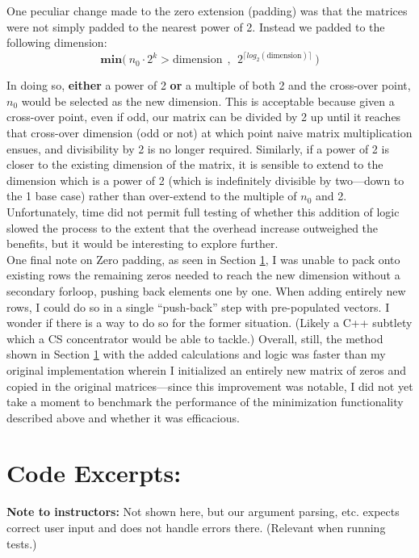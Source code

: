 \documentclass[conference]{styles/acmsiggraph}
\newcommand{\?}{\stackrel{?}{=}}
\begin{document}
One peculiar change made to the zero extension (padding) was that the matrices were not simply padded to the nearest power of 2.  Instead we padded to the following dimension: 
$$\mathbf{min(}\ n_0 \cdot 2^k > \text{dimension}\ \ \mathbf{,}\ \  2^{ \lceil log_2(\text{dimension}) \rceil }\ \mathbf{)}$$

In doing so, \textbf{either} a power of 2 \textbf{or} a multiple of both 2 and the cross-over point, $n_0$ would be selected as the new dimension.  This is acceptable because given a cross-over point, even if odd, our matrix can be divided by 2 up until it reaches that cross-over dimension (odd or not) at which point naive matrix multiplication ensues, and divisibility by 2 is no longer required.  Similarly, if a power of 2 is closer to the existing dimension of the matrix, it is sensible to extend to the dimension which is a power of 2 (which is indefinitely divisible by two---down to the 1 base case) rather than over-extend to the multiple of $n_0$ and 2. \\

Unfortunately, time did not permit full testing of whether this addition of logic slowed the process to the extent that the overhead increase outweighed the benefits, but it would be interesting to explore further. \\

One final note on Zero padding, as seen in Section \ref{section:CODE}, I was unable to pack onto existing rows the remaining zeros needed to reach the new dimension without a secondary forloop, pushing back elements one by one.  When adding entirely new rows, I could do so in a single \enquote{push-back} step with pre-populated vectors.  I wonder if there is a way to do so for the former situation.  (Likely a C++ subtlety which a CS concentrator would be able to tackle.)  Overall, still, the method shown in Section \ref{section:CODE} with the added calculations and logic was faster than my original implementation wherein I initialized an entirely new matrix of zeros and copied in the original matrices---since this improvement was notable, I did not yet take a moment to benchmark the performance of the minimization functionality described above and whether it was efficacious.

\section{Code Excerpts:} \label{section:CODE}
\textbf{Note to instructors:} Not shown here, but our argument parsing, etc. expects correct user input and does not handle errors there.  (Relevant when running tests.)
\end{document}

